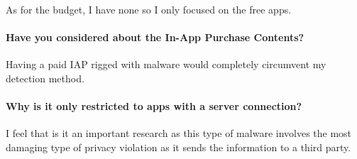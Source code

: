 As for the budget, I have none so I only focused on the free apps.

\paragraph{Have you considered about the In-App Purchase Contents?}

Having a paid IAP rigged with malware would completely circumvent my detection method. 

\paragraph{Why is it only restricted to apps with a server connection?}

I feel that is it an important research as this type of malware involves the most damaging type of privacy violation as it sends the information to a third party.





